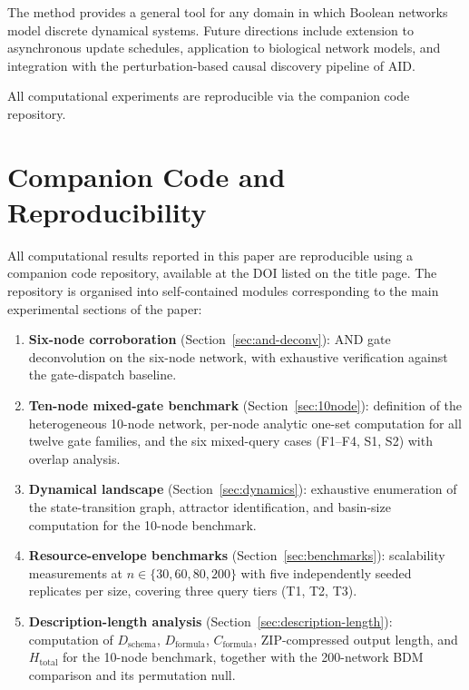 \documentclass[11pt]{article}
\begin{document}
The method provides a general tool for any domain in which Boolean
networks model discrete dynamical systems.  Future directions include
extension to asynchronous update schedules, application to biological
network models, and integration with the perturbation-based causal
discovery pipeline of AID.

All computational experiments are reproducible via the companion code
repository.


\appendix
\section{Companion Code and Reproducibility}\label{app:code}

All computational results reported in this paper are reproducible using a
companion code repository, available at the DOI listed on the title page.
The repository is organised into self-contained modules corresponding to
the main experimental sections of the paper:

\begin{enumerate}
\item \textbf{Six-node corroboration} (Section~\ref{sec:and-deconv}):
  AND gate deconvolution on the six-node network, with exhaustive
  verification against the gate-dispatch baseline.

\item \textbf{Ten-node mixed-gate benchmark} (Section~\ref{sec:10node}):
  definition of the heterogeneous 10-node network, per-node analytic
  one-set computation for all twelve gate families, and the six mixed-query
  cases (F1--F4, S1, S2) with overlap analysis.

\item \textbf{Dynamical landscape} (Section~\ref{sec:dynamics}):
  exhaustive enumeration of the state-transition graph, attractor
  identification, and basin-size computation for the 10-node benchmark.

\item \textbf{Resource-envelope benchmarks}
  (Section~\ref{sec:benchmarks}): scalability measurements at
  $n\in\{30,60,80,200\}$ with five independently seeded replicates per
  size, covering three query tiers (T1, T2, T3).

\item \textbf{Description-length analysis}
  (Section~\ref{sec:description-length}): computation of
  $D_{\mathrm{schema}}$, $D_{\mathrm{formula}}$, $C_{\mathrm{formula}}$,
  ZIP-compressed output length, and $H_{\mathrm{total}}$ for the 10-node
  benchmark, together with the 200-network BDM comparison and its
  permutation null.
\end{enumerate}
\end{document}
